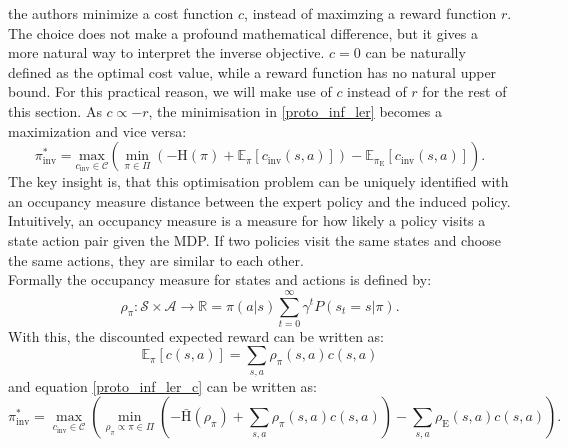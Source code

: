 the authors minimize a cost function $c$, instead of maximzing a reward function $r$. The choice does not make a profound 
mathematical difference, but it gives a more natural way to interpret the inverse objective. $c=0$ can be naturally defined as the optimal cost value, while a reward function has 
no natural upper bound. For this practical reason, we will make use of $c$ instead of $r$ for the rest of this section. As $c \propto -r$, the minimisation in 
\ref{proto_inf_ler} becomes a maximization and vice versa:
\begin{equation}
    \label{proto_inf_ler_c}
    \pi_{\text{inv}}^* = \underset{c_{\text{inv}} \in \mathcal{C}}{\text{max}} \left( \min_{\pi \in \Pi} \left(- \text{H}(\pi) + \mathbb{E}_{\pi}[c_{\text{inv}}(s, a)] \right) - \mathbb{E}_{\pi_{\text{E}}}[c_{\text{inv}}(s,a)] \right).
\end{equation}
The key insight is, that this optimisation problem can be uniquely identified with an occupancy measure distance between the expert policy and the 
induced policy. Intuitively, an occupancy measure is a measure for how likely a policy visits a state action pair given the MDP. If two policies visit the same 
states and choose the same actions, they are similar to each other.\\
Formally the occupancy measure for states and actions is defined by: 
\begin{equation*}
    \rho_{\pi}:\mathcal{S} \times \mathcal{A} \rightarrow \mathbb{R} = \pi(a|s)\sum_{t=0}^\infty \gamma^tP(s_t=s|\pi).
\end{equation*}
With this, the discounted expected reward can be written as:
\begin{equation}
    \mathbb{E}_\pi[c(s,a)] = \sum_{s,a} \rho_\pi(s,a) c(s,a)
\end{equation}
and equation \ref{proto_inf_ler_c} can be written as:
\begin{equation}
    \label{occ_meas_obj}
    \pi_{\text{inv}}^* = \max_{c_{\text{inv}} \in \mathcal{C}} \left( \min_{\rho_\pi \propto \pi \in \Pi} \left(- \bar{\text{H}}(\rho_\pi) + \sum_{s,a} \rho_\pi(s,a) c(s,a) \right) - \sum_{s,a} \rho_{\text{E}}(s,a) c(s,a) \right).
\end{equation}

